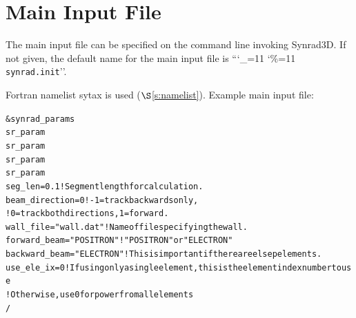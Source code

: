 \documentclass[11pt]{article}
\newcommand{\sref}[1]{$\S$\ref{#1}}
\newcommand\ttcmd{\begingroup\catcode`\_=11 \catcode`\%=11 \dottcmd}
\newcommand\dottcmd[1]{\texttt{#1}\endgroup}
\newcommand{\vn}{\ttcmd}
\newenvironment{example}
  {\vspace{-3.0ex} \begin{alltt}}
  {\end{alltt} \vspace{-2.5ex}}
\begin{document}
\section{Main Input File} 

The main input file can be specified on the command line invoking Synrad3D.
If not given, the default name for the main input file is ``\vn{synrad.init}''.

Fortran namelist sytax is used (\sref{s:namelist}). Example main
input file:
\begin{example}
  &synrad_params
    sr_param%
    sr_param%
    sr_param%
    sr_param%
    seg_len = 0.1                    ! Segment length for calculation.
    beam_direction = 0               ! -1 = track backwards only,
                                     !  0 = track both directions, 1 = forward.
    wall_file = "wall.dat"           ! Name of file specifying the wall.
    forward_beam  = "POSITRON"       ! "POSITRON" or "ELECTRON"
    backward_beam = "ELECTRON"       !  This is important if there are elsep elements.
    use_ele_ix = 0   ! If using only a single element, this is the element index number to use
          ! Otherwise, use 0 for power from all elements
  /
\end{example}
\end{document}
